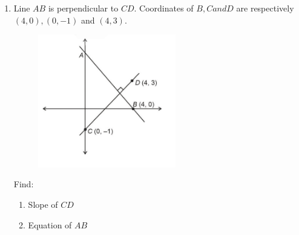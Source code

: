 \documentclass{article}
\begin{document}
\begin{enumerate}
	\item Line $AB$ is perpendicular to $CD$. Coordinates of $B, C and D$ are respectively $(4, 0), (0, -1)$ and $(4,3)$.
		\begin{figure}[h]
			\centering
			\includegraphics[width=60mm]{figs/img6.jpg}
			\label{figure}
		\end{figure}
		Find:
		\begin{enumerate}
			\item Slope of $CD$
			\item Equation of $AB$
		\end{enumerate}
\end{enumerate}
\end{document}
